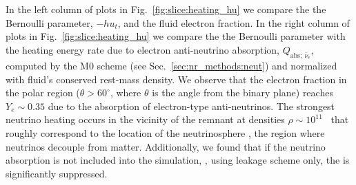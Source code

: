 %
In the left column of plots in Fig.~\ref{fig:slice:heating_hu} we compare 
the the Bernoulli parameter, $-hu_t$, 
and the fluid electron fraction. 
%
In the right column of plots in Fig.~\ref{fig:slice:heating_hu} we compare 
the the Bernoulli parameter with the heating energy rate due to electron anti-neutrino absorption, 
$Q_{\text{abs};\:\bar{\nu}_e}$, computed by the M0 scheme 
(see Sec.~\ref{sec:nr_methods:neut}) and 
normalized with fluid's conserved rest-mass density.
We observe that the electron fraction in the polar region  
($\theta>60^{\circ}$, where $\theta$ is the angle from the binary plane) 
reaches $Y_e\sim0.35$ due to the absorption of 
electron-type anti-neutrinos.
The strongest neutrino heating occurs in the vicinity of the remnant at densities 
$\rho\sim10^{11}$~\gcm{} that roughly correspond
to the location of the neutrinosphere \citep{Endrizzi:2019trv}, 
the region where neutrinos decouple from matter.
%
%
Additionally, we found that if the neutrino absorption is not included into the 
simulation, \eg, using leakage scheme only, the \nwind{} is significantly suppressed.  %
%

